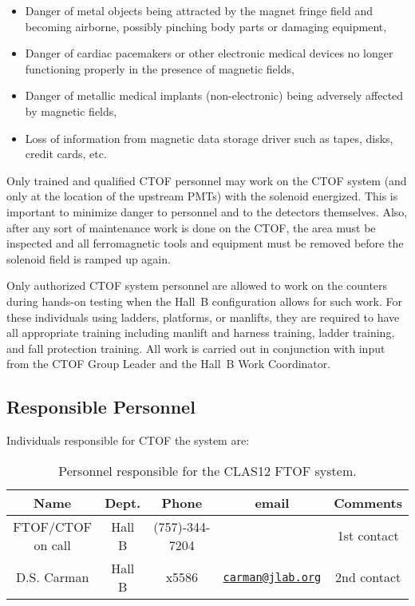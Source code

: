 \begin{itemize}
\item Danger of metal objects being attracted by the magnet fringe field and becoming airborne, 
possibly pinching body parts or damaging equipment,
\item Danger of cardiac pacemakers or other electronic medical devices no longer functioning 
properly in the presence of magnetic fields,
\item Danger of metallic medical implants (non-electronic) being adversely affected by magnetic 
fields,
\item Loss of information from magnetic data storage driver such as tapes, disks, credit cards, 
etc.
\end{itemize}

Only trained and qualified CTOF personnel may work on the CTOF system (and only at the 
location of the upstream PMTs) with the solenoid energized. This is important to minimize 
danger to personnel and to the detectors themselves. Also, after any sort of maintenance 
work is done on the CTOF, the area must be inspected and all ferromagnetic tools and 
equipment must be removed before the solenoid field is ramped up again.

Only authorized CTOF system personnel are allowed to work on the counters during hands-on
testing when the Hall~B configuration allows for such work. For these individuals using 
ladders, platforms, or manlifts, they are required to have all appropriate training 
including manlift and harness training, ladder training, and fall protection training. All 
work is carried out in conjunction with input from the CTOF Group Leader and the Hall~B Work 
Coordinator.

\subsection{Responsible Personnel}

Individuals responsible for CTOF the system are:

\begin{table}[!htb]
\centering
\begin{tabular}{|c|c|c|c|c|} \hline
Name              & Dept.  & Phone          & email & Comments \\ \hline
FTOF/CTOF on call & Hall B & (757)-344-7204 &       & 1st contact \\ \hline
D.S. Carman       & Hall B & x5586          & \href{mailto:carman@jlab.org}{\nolinkurl{carman@jlab.org}} & 2nd contact \\ \hline
\end{tabular}
\caption{Personnel responsible for the CLAS12 FTOF system.} 
\label{tb:ftof}
\end{table}

\vfil
\eject
